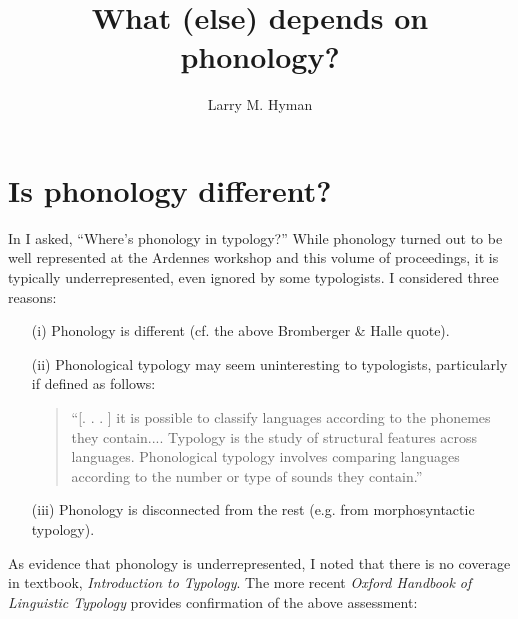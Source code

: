 \documentclass[output=paper]{langsci/langscibook}
\author{Larry M. Hyman\affiliation{University of California, Berkeley}}
\title{What (else) depends on phonology?}
\begin{document}
 


\section{Is phonology different?}

  In \citet{Hyman2007} I asked, “Where’s phonology in typology?” While phonology turned out to be well represented at the Ardennes workshop and this volume of proceedings, it is typically underrepresented, even ignored by some typologists. I considered three reasons:

\begin{itemize}
 \item[(i)] Phonology is different (cf. the above Bromberger \& Halle quote).
 \item[(ii)] Phonological typology may seem uninteresting to typologists, particularly if defined as follows:

\begin{quote}

 “[. . . ] it is possible to classify languages according to the phonemes they contain.... Typology is the study of structural features across languages. Phonological typology involves comparing languages according to the number or type of sounds they contain.” \citep{Vajda2001}
\end{quote}

 \item[(iii)]   Phonology is disconnected from the rest (e.g. from morphosyntactic typology).
\end{itemize}

  As evidence that phonology is underrepresented, I noted that there is no coverage in  textbook, \textit{Introduction to Typology}. The more recent \textit{Oxford Handbook of Linguistic Typology} \citep{Song2011} provides confirmation of the above assessment:
\end{document}
